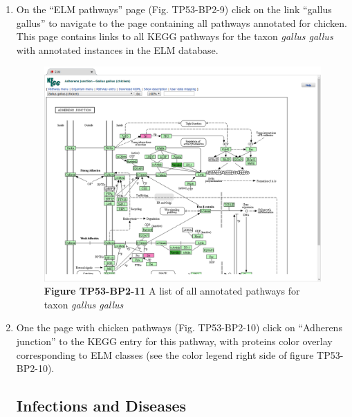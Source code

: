 \begin{enumerate}
\item On the ``ELM pathways'' page (Fig. TP53-BP2-9) click on the link ``gallus
	gallus'' to navigate to the page containing all pathways annotated for
	chicken. This page contains links to all KEGG pathways for the taxon
	\emph{gallus gallus} with annotated instances in the ELM database.

\begin{figure}[h!]
	\centering
	\includegraphics[width=\textwidth]{Figures/explore_content/pathways_kegg.png} 
	\caption{
	\textbf{Figure TP53-BP2-11}
	A list of all annotated pathways for taxon \emph{gallus gallus}
	}
	\label{fig:explore_content_pathways_kegg}
\end{figure}

\item One the page with chicken pathways (Fig. TP53-BP2-10) click on ``Adherens
	junction'' to the KEGG entry for this pathway, with proteins color
	overlay corresponding to ELM classes (see the color legend right side
	of figure TP53-BP2-10).

\subsection{Infections and Diseases}\label{infections-and-diseases}


\end{enumerate}

